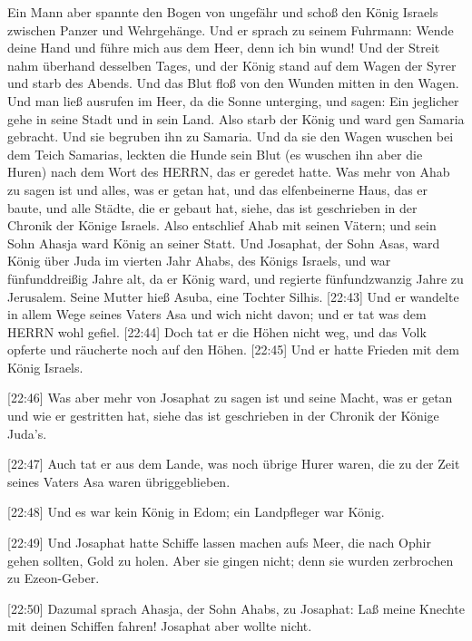 Ein Mann aber spannte den Bogen von ungefähr und schoß den König Israels
zwischen Panzer und Wehrgehänge. Und er sprach zu seinem Fuhrmann: Wende
deine Hand und führe mich aus dem Heer, denn ich bin wund! 
Und der Streit nahm überhand desselben Tages, und der König stand auf
dem Wagen der Syrer und starb des Abends. Und das Blut floß von den
Wunden mitten in den Wagen.  Und man ließ ausrufen im Heer,
da die Sonne unterging, und sagen: Ein jeglicher gehe in seine Stadt und
in sein Land.  Also starb der König und ward gen Samaria
gebracht. Und sie begruben ihn zu Samaria.  Und da sie den
Wagen wuschen bei dem Teich Samarias, leckten die Hunde sein Blut (es
wuschen ihn aber die Huren) nach dem Wort des HERRN, das er geredet
hatte.  Was mehr von Ahab zu sagen ist und alles, was er
getan hat, und das elfenbeinerne Haus, das er baute, und alle Städte,
die er gebaut hat, siehe, das ist geschrieben in der Chronik der Könige
Israels.  Also entschlief Ahab mit seinen Vätern; und sein
Sohn Ahasja ward König an seiner Statt.  Und Josaphat, der
Sohn Asas, ward König über Juda im vierten Jahr Ahabs, des Königs
Israels,  und war fünfunddreißig Jahre alt, da er König
ward, und regierte fünfundzwanzig Jahre zu Jerusalem. Seine Mutter hieß
Asuba, eine Tochter Silhis. {[}22:43{]} Und er wandelte in allem Wege
seines Vaters Asa und wich nicht davon; und er tat was dem HERRN wohl
gefiel.  {[}22:44{]} Doch tat er die Höhen nicht weg, und
das Volk opferte und räucherte noch auf den Höhen. 
{[}22:45{]} Und er hatte Frieden mit dem König Israels.

 {[}22:46{]} Was aber mehr von Josaphat zu sagen ist und
seine Macht, was er getan und wie er gestritten hat, siehe das ist
geschrieben in der Chronik der Könige Juda's.

 {[}22:47{]} Auch tat er aus dem Lande, was noch übrige
Hurer waren, die zu der Zeit seines Vaters Asa waren übriggeblieben.

 {[}22:48{]} Und es war kein König in Edom; ein Landpfleger
war König.

 {[}22:49{]} Und Josaphat hatte Schiffe lassen machen aufs
Meer, die nach Ophir gehen sollten, Gold zu holen. Aber sie gingen
nicht; denn sie wurden zerbrochen zu Ezeon-Geber.

 {[}22:50{]} Dazumal sprach Ahasja, der Sohn Ahabs, zu
Josaphat: Laß meine Knechte mit deinen Schiffen fahren! Josaphat aber
wollte nicht.

